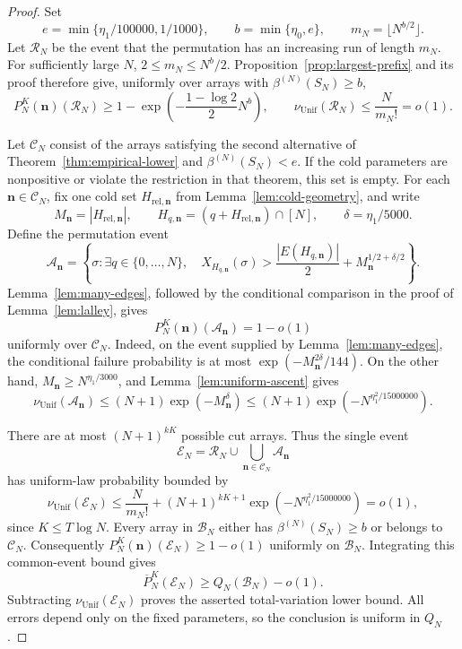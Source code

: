\documentclass[11pt]{article}
\numberwithin{equation}{section}
\theoremstyle{definition}
\theoremstyle{remark}
\newcommand{\Unif}{\mathrm{Unif}}
\newcommand{\nuUnif}{\nu_{\Unif}}
\newcommand{\1}{\mathbf 1}
\begin{document}
\begin{proof}
Set
\[
 e=\min\{\eta_1/100000,1/1000\},\qquad
 b=\min\{\eta_0,e\},\qquad
 m_N=\lfloor N^{b/2}\rfloor.
\]
Let $\mathcal R_N$ be the event that the permutation has an
increasing run of length $m_N$. For sufficiently large $N$,
$2\le m_N\le N^b/2$. Proposition~\ref{prop:largest-prefix} and
its proof therefore give, uniformly over arrays with
$\beta^{(N)}(S_N)\ge b$,
\[
 P_N^K(\mathbf n)(\mathcal R_N)
 \ge1-\exp\left(-\frac{1-\log2}{2}N^b\right),\qquad
 \nuUnif(\mathcal R_N)\le\frac{N}{m_N!}=o(1).
\]

Let $\mathcal C_N$ consist of the arrays satisfying the second
alternative of Theorem~\ref{thm:empirical-lower} and
$\beta^{(N)}(S_N)<e$. If the cold parameters are nonpositive or
violate the restriction in that theorem, this set is empty.
For each $\mathbf n\in\mathcal C_N$, fix one cold set
$H_{\mathrm{rel},\mathbf n}$ from
Lemma~\ref{lem:cold-geometry}, and write
\[
 M_{\mathbf n}=|H_{\mathrm{rel},\mathbf n}|,\qquad
 H_{q,\mathbf n}=(q+H_{\mathrm{rel},\mathbf n})\cap[N],\qquad
 \delta=\eta_1/5000.
\]
Define the permutation event
\[
 \mathcal A_{\mathbf n}
 =\left\{\sigma:\exists q\in\{0,\ldots,N\},\quad
 X_{H_{q,\mathbf n}}(\sigma)>
 \frac{|E(H_{q,\mathbf n})|}{2}
       +M_{\mathbf n}^{1/2+\delta/2}\right\}.
\]
Lemma~\ref{lem:many-edges}, followed by the conditional comparison
in the proof of Lemma~\ref{lem:lalley}, gives
\[
 P_N^K(\mathbf n)(\mathcal A_{\mathbf n})=1-o(1)
\]
uniformly over $\mathcal C_N$. Indeed, on the event supplied by
Lemma~\ref{lem:many-edges}, the conditional failure probability
is at most $\exp(-M_{\mathbf n}^{2\delta}/144)$.
On the other hand, $M_{\mathbf n}\ge N^{\eta_1/3000}$, and
Lemma~\ref{lem:uniform-ascent} gives
\[
 \nuUnif(\mathcal A_{\mathbf n})
 \le (N+1)\exp(-M_{\mathbf n}^{\delta})
 \le (N+1)\exp\left(-N^{\eta_1^2/15000000}\right).
\]

There are at most $(N+1)^{kK}$ possible cut arrays. Thus the
single event
\[
 \mathcal E_N=\mathcal R_N\cup
           \bigcup_{\mathbf n\in\mathcal C_N}\mathcal A_{\mathbf n}
\]
has uniform-law probability bounded by
\[
 \nuUnif(\mathcal E_N)
 \le\frac{N}{m_N!}
 +(N+1)^{kK+1}\exp\left(-N^{\eta_1^2/15000000}\right)
 =o(1),
\]
since $K\le T\log N$.
Every array in $\mathcal B_N$ either has
$\beta^{(N)}(S_N)\ge b$ or belongs to $\mathcal C_N$.
Consequently
$P_N^K(\mathbf n)(\mathcal E_N)\ge1-o(1)$ uniformly on
$\mathcal B_N$. Integrating this common-event bound gives
\[
 \overline P_N^K(\mathcal E_N)\ge Q_N(\mathcal B_N)-o(1).
\]
Subtracting $\nuUnif(\mathcal E_N)$ proves the asserted
total-variation lower bound. All errors depend only on the fixed
parameters, so the conclusion is uniform in $Q_N$.
\end{proof}
\end{document}
